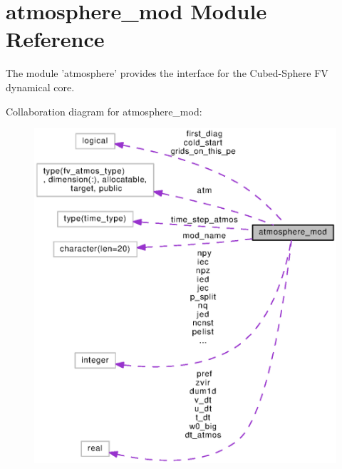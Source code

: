 \section{atmosphere\-\_\-mod Module Reference}
\label{classatmosphere__mod}


The module 'atmosphere' provides the interface for the Cubed-\/\-Sphere F\-V dynamical core.  




Collaboration diagram for atmosphere\-\_\-mod\-:
\nopagebreak
\begin{figure}[H]
\begin{center}
\leavevmode
\includegraphics[width=350pt]{classatmosphere__mod__coll__graph}
\end{center}
\end{figure}
